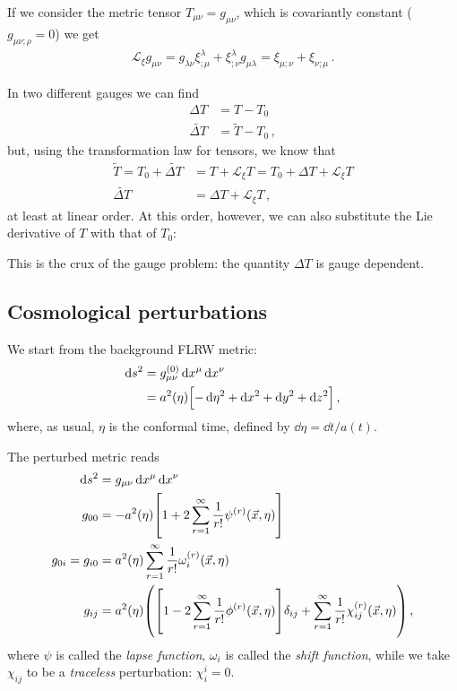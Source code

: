 \documentclass[main.tex]{subfiles}
\begin{document}
If we consider the metric tensor \(T_{\mu \nu } = g_{\mu \nu }\), which is covariantly constant (\(g_{\mu \nu ; \rho } = 0\)) we get 
%
\begin{align}
\mathscr{L}_\xi g_{\mu \nu } = g_{\lambda \nu } \xi^{\lambda }_{; \mu } + \xi^{\lambda }_{; \nu } g_{\mu \lambda } = \xi_{\mu ; \nu } + \xi_{\nu ; \mu }
\,.
\end{align}

In two different gauges we can find 
%
\begin{align}
\Delta T &= T - T_0  \\
\widetilde{\Delta T} &= \widetilde{T} - T_0 
\,,
\end{align}
%
but, using the transformation law for tensors, we know that
%
\begin{align}
\widetilde{T} = T_0 + \widetilde{\Delta T}  &= T + \mathscr{L}_\xi T = T_0 + \Delta T + \mathscr{L}_\xi T  \\
\widetilde{\Delta T} &= \Delta T + \mathscr{L}_\xi T
\,,
\end{align}
%
at least at linear order. At this order, however, we can also substitute the Lie derivative of \(T\) with that of \(T_0 \): 
%

This is the crux of the gauge problem: the quantity \(\Delta T\) is gauge dependent. 

\subsection{Cosmological perturbations}

We start from the background FLRW metric: 
%
\begin{align}
\dd{s^2} &= g_{\mu \nu }^{(0)} \dd{x^{\mu }} \dd{x^{\nu }}  \\
&= a^2(\eta ) \qty[- \dd{\eta^2} + \dd{x^2} + \dd{y^2} + \dd{z^2}]
\,,
\end{align}
%
where, as usual, \(\eta \) is the conformal time, defined by \(\dd{\eta } = \dd{t} / a(t)\). 

The perturbed metric reads 
%
\begin{align}
\dd{s^2} &= g_{\mu \nu } \dd{x^{\mu }} \dd{x^{\nu }}  \\
g_{00} &= - a^2(\eta ) \qty[1 + 2 \sum _{r=1}^{\infty } \frac{1}{r!} \psi^{(r)} (\vec{x}, \eta )]  \\
g_{0i } = g_{i0} &= a^2(\eta ) \sum _{r=1}^{\infty } \frac{1}{r!} \omega_{i}^{(r)} (\vec{x}, \eta )  \\
g_{ij } &= a^2(\eta ) \qty( \qty[1 - 2 \sum _{r=1}^{\infty } \frac{1}{r!} \phi^{(r)} (\vec{x}, \eta )] \delta_{ij} + \sum _{r=1}^{\infty } \frac{1}{r! } \chi_{ij}^{(r)} (\vec{x}, \eta ))
\,,
\end{align}
%
where \(\psi\) is called the \emph{lapse function}, \(\omega_{i} \) is called the \emph{shift function}, while we take \(\chi_{ij}\) to be a \emph{traceless} perturbation: \(\chi^{i}_{i} = 0\).
\end{document}
